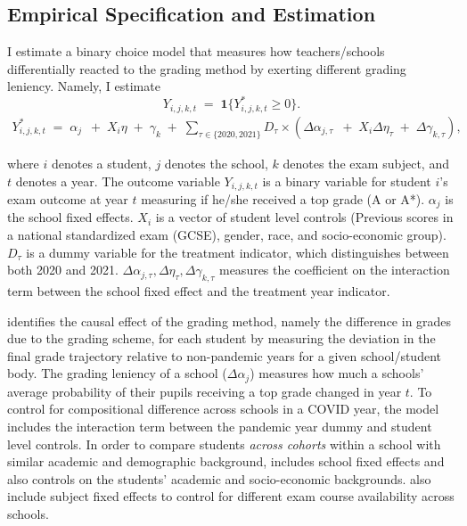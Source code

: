 
\subsection{Empirical Specification and Estimation}
I estimate a binary choice model that measures how teachers/schools differentially reacted to the grading method by exerting different grading leniency.  Namely, I estimate
\[
Y_{i,j,k,t} \;=\; \mathbf{1}\{Y_{i,j,k,t}^* \ge 0\}.
\]
\begin{align}
    \label{eq:main}
    Y_{i,j,k,t}^*
    \;=\;\alpha_j\ 
    \;+\; 
    X_i\eta
    \;+\;
    \gamma_{k} 
    \;+\;
    \sum_{\tau\in \{2020, 2021\}}D_\tau\times\left(\Delta\alpha_{j,\tau}\ 
    \;+\;
    X_i\Delta\eta_{\tau}
    \;+\;
    \Delta\gamma_{k,\tau} \right),
\end{align}

where $i$ denotes a student, $j$ denotes the school, $k$ denotes the exam subject, and $t$ denotes a year. The outcome variable $Y_{i,j,k,t}$ is a binary variable for student $i$'s exam outcome at year $t$ measuring if he/she received a top grade (A or A*). $\alpha_j$ is the school fixed effects. $X_i$ is a vector of student level controls (Previous scores in a national standardized exam (GCSE), gender, race, and socio-economic group). $D_\tau$ is a dummy variable for the treatment indicator, which distinguishes between both 2020 and 2021.  $\Delta \alpha_{j,\tau}, \Delta \eta_{\tau}, \Delta \gamma_{k,\tau}$ measures the coefficient on the interaction term between the school fixed effect and the treatment year indicator. 

 identifies the causal effect of the grading method, namely the difference in grades due to the grading scheme, for each student by measuring the deviation in the final grade trajectory relative to non-pandemic years for a given school/student body. The grading leniency of a school ($\Delta\alpha_j$) measures how much a schools' average probability of their pupils receiving a top grade changed in year $t$. To control for compositional difference across schools in a COVID year, the model includes the interaction term between the pandemic year dummy and student level controls. In order to compare students \emph{across cohorts} within a school with similar academic and demographic background,  includes school fixed effects and also controls on the students' academic and socio-economic backgrounds. \Cref{eq:main} also include subject fixed effects to control for different exam course availability across schools.  

